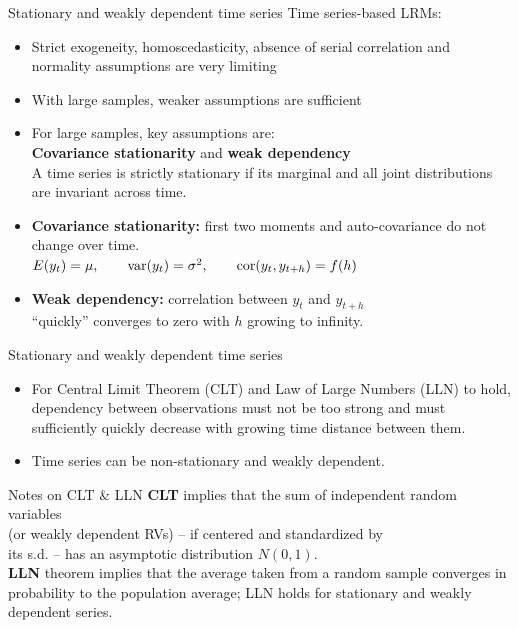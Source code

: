 \documentclass{beamer}
\begin{document}
\begin{frame}{Stationary and weakly dependent time series}
Time series-based LRMs:
\begin{itemize}
\item Strict exogeneity, homoscedasticity, absence of serial correlation and normality assumptions are very limiting 
\medskip
\item With large samples, weaker assumptions are sufficient
\medskip
\item For large samples, key assumptions are: \\ \textbf{Covariance stationarity} and \textbf{weak dependency}\\
\medskip
A time series is strictly stationary if its marginal and all joint distributions are invariant across time.
\medskip
\item \textbf{Covariance stationarity:} first two moments and auto-covariance do not change over time.\\
$E(y_t)= \mu,\qquad \textnormal{var}(y_t) = \sigma^2,\qquad \textnormal{cor}(y_t,y_{t+h})=f(h)$
\medskip
\item \textbf{Weak dependency:} correlation between $y_t$ and $y_{t+h}$ \\``quickly'' converges to zero with $h$ growing to infinity.
\end{itemize}
\end{frame}
\begin{frame}{Stationary and weakly dependent time series}
\begin{itemize}
\item For Central Limit Theorem (CLT) and Law of Large Numbers (LLN) to hold, dependency between observations must not be too strong and must sufficiently quickly decrease with growing time distance between them.
\medskip
\item Time series can be non-stationary and weakly dependent.
\end{itemize}
\begin{block}{Notes on CLT \& LLN}
\textbf{CLT} implies that the sum of independent random variables \\(or weakly dependent RVs) -- if centered and standardized by \\its s.d. -- has an asymptotic distribution $N(0,1)$.\\ \vspace{0.1cm}
\textbf{LLN} theorem implies that the average taken from a random sample converges in probability to the population average; LLN holds for stationary and weakly dependent series.
\end{block}
\end{frame}
\end{document}
